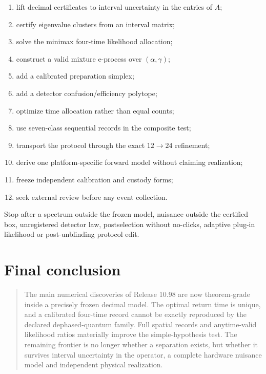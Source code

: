 \documentclass[11pt,a4paper]{article}
\begin{document}
\begin{enumerate}
\item lift decimal certificates to interval uncertainty in the entries of $A$;
\item certify eigenvalue clusters from an interval matrix;
\item solve the minimax four-time likelihood allocation;
\item construct a valid mixture e-process over $(\alpha,\gamma)$;
\item add a calibrated preparation simplex;
\item add a detector confusion/efficiency polytope;
\item optimize time allocation rather than equal counts;
\item use seven-class sequential records in the composite test;
\item transport the protocol through the exact $12\to24$ refinement;
\item derive one platform-specific forward model without claiming realization;
\item freeze independent calibration and custody forms;
\item seek external review before any event collection.
\end{enumerate}

Stop after a spectrum outside the frozen model, nuisance outside the certified
box, unregistered detector law, postselection without no-clicks, adaptive
plug-in likelihood or post-unblinding protocol edit.

\section{Final conclusion}

\begin{quote}
The main numerical discoveries of Release 10.98 are now theorem-grade inside a
precisely frozen decimal model.  The optimal return time is unique, and a
calibrated four-time record cannot be exactly reproduced by the declared
dephased-quantum family.  Full spatial records and anytime-valid likelihood
ratios materially improve the simple-hypothesis test.  The remaining frontier
is no longer whether a separation exists, but whether it survives interval
uncertainty in the operator, a complete hardware nuisance model and independent
physical realization.
\end{quote}

\appendix
\end{document}
